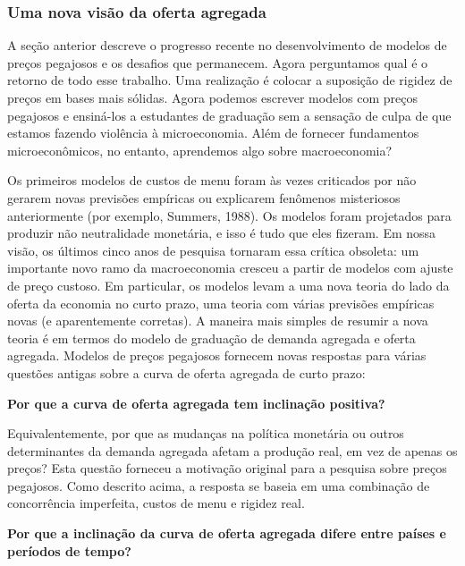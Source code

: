 \documentclass[a4paper,12pt]{article}[abntex2]
\begin{document}
\subsubsection{\textbf{Uma nova visão da oferta agregada}}

A seção anterior descreve o progresso recente no desenvolvimento de modelos de preços pegajosos e os desafios que permanecem. Agora perguntamos qual é o retorno de todo esse trabalho. Uma realização é colocar a suposição de rigidez de preços em bases mais sólidas. Agora podemos escrever modelos com preços pegajosos e ensiná-los a estudantes de graduação sem a sensação de culpa de que estamos fazendo violência à microeconomia. Além de fornecer fundamentos microeconômicos, no entanto, aprendemos algo sobre macroeconomia?

Os primeiros modelos de custos de menu foram às vezes criticados por não gerarem novas previsões empíricas ou explicarem fenômenos misteriosos anteriormente (por exemplo, Summers, 1988). Os modelos foram projetados para produzir não neutralidade monetária, e isso é tudo que eles fizeram. Em nossa visão, os últimos cinco anos de pesquisa tornaram essa crítica obsoleta: um importante novo ramo da macroeconomia cresceu a partir de modelos com ajuste de preço custoso. Em particular, os modelos levam a uma nova teoria do lado da oferta da economia no curto prazo, uma teoria com várias previsões empíricas novas (e aparentemente corretas). A maneira mais simples de resumir a nova teoria é em termos do modelo de graduação de demanda agregada e oferta agregada. Modelos de preços pegajosos fornecem novas respostas para várias questões antigas sobre a curva de oferta agregada de curto prazo:

\textbf{Por que a curva de oferta agregada tem inclinação positiva?}

Equivalentemente, por que as mudanças na política monetária ou outros determinantes da demanda agregada afetam a produção real, em vez de apenas os preços? Esta questão forneceu a motivação original para a pesquisa sobre preços pegajosos. Como descrito acima, a resposta se baseia em uma combinação de concorrência imperfeita, custos de menu e rigidez real.

\textbf{Por que a inclinação da curva de oferta agregada difere entre países e períodos de tempo?}
\end{document}
